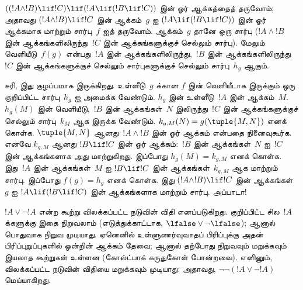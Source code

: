 \documentclass[../../../include/open-logic-section]{subfiles}
\begin{document}
\begin{ex}
$((!A \land !B) \lif !C) \lif (!A \lif (!B \lif !C))$ இன் ஓர்
ஆக்கத்தைத் தருவோம்; அதாவது $(!A \land !B) \lif !C$ இன் ஆக்கம்~$g$ ஐ
$(!A \lif (!B \lif !C))$ இன் ஓர் ஆக்கமாக மாற்றும் சார்பு~$f$ ஐத் தருவோம்.
ஆக்கம்~$g$ தானே ஒரு சார்பு ($!A \land !B$ இன் ஆக்கங்களிலிருந்து~$!C$ இன்
ஆக்கங்களுக்குச் செல்லும் சார்பு). மேலும் வெளியீடு~$f(g)$ என்பது~$!A$ இன்
ஆக்கங்களிலிருந்து,~$!B$ இன் ஆக்கங்களிலிருந்து~$!C$ இன் ஆக்கங்களுக்குச்
செல்லும் சார்புகளுக்குச் செல்லும் சார்பு~$h_g$ ஆகும்.

சரி, இது குழப்பமாக இருக்கிறது. உள்ளீடு~$g$ க்கான $f$ இன் வெளியீடாக இருக்கும்
ஒரு குறிப்பிட்ட சார்பு~$h_g$ ஐ அமைக்க வேண்டும். $h_g$ இன் உள்ளீடு~$!A$ இன்
ஆக்கம்~$M$. $h_g(M)$ இன் வெளியீடு,~$!B$ இன் ஆக்கங்கள்~$N$ இலிருந்து~$!C$ இன்
ஆக்கங்களுக்குச் செல்லும் சார்பு~$k_M$ ஆக இருக்க வேண்டும். $k_{g,M}(N) =
g(\tuple{M, N})$ எனக் கொள்க. $\tuple{M, N}$ ஆனது~$!A \land !B$ இன் ஓர்
ஆக்கம் என்பதை நினைவுகூர்க. எனவே $k_{g,M}$ ஆனது $!B \lif !C$ இன் ஓர்
ஆக்கம்:~$!B$ இன் ஆக்கங்கள்~$N$ ஐ~$!C$ இன் ஆக்கங்களாக அது மாற்றுகிறது.
இப்போது $h_g(M) = k_{g,M}$ எனக் கொள்க. இது~$!A$ இன் ஆக்கங்கள்~$M$ ஐ
$!B \lif !C$ இன் ஆக்கங்கள்~$k_{g,M}$ ஆக மாற்றும் சார்பு. இப்போது $f(g) =
h_g$ எனக் கொள்க. இது $(!A \land !B) \lif !C$ இன் ஆக்கங்கள்~$g$ ஐ
$!A \lif (!B \lif !C)$ இன் ஆக்கங்களாக மாற்றும் சார்பு. அப்பாடா!{}
\end{ex}

$!A \lor \lnot !A$ என்ற கூற்று விலக்கப்பட்ட நடுவின் விதி எனப்படுகிறது.
குறிப்பிட்ட சில~$!A$ க்களுக்கு இதை நிறுவலாம் (எடுத்துக்காட்டாக, $\lfalse
\lor \lnot \lfalse$); ஆனால் பொதுவாக நிறுவ முடியாது. ஏனெனில்
உள்ளுணர்வுவாதப் பிரிப்புக்கு அதன் பிரிப்புறுப்புகளில் ஒன்றின் ஆக்கம் தேவை;
ஆனால் தற்போது நிறுவவும் மறுக்கவும் இயலாத கூற்றுகள் உள்ளன (கோல்ட்பாக்
கருதுகோள் போன்றவை). எனினும், விலக்கப்பட்ட நடுவின் விதியை மறுக்கவும்
முடியாது: அதாவது, $\lnot \lnot (!A \lor \lnot !A)$ மெய்யாகிறது.
\end{document}

